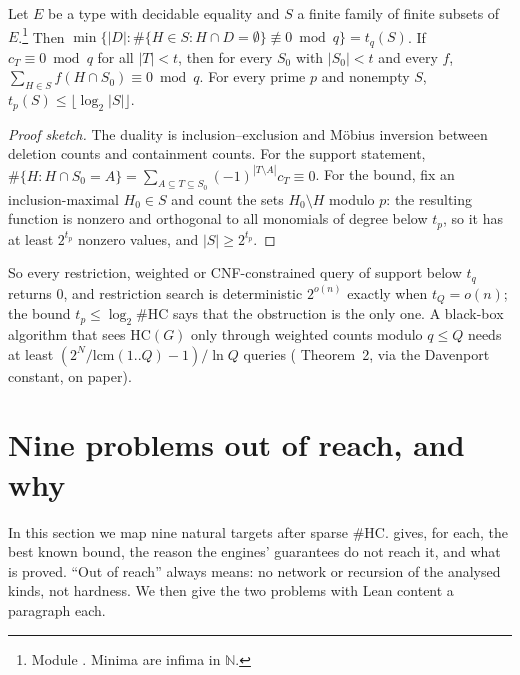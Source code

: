 \documentclass[10pt]{amsart}
\theoremstyle{plain}
\theoremstyle{definition}
\theoremstyle{remark}
\numberwithin{equation}{section}
\newcommand{\N}{\mathbb{N}}
\begin{document}
\begin{theorem}\label{thm:derand}
Let $E$ be a type with decidable equality and $S$ a finite family of finite subsets of
$E$.\footnote{Module . Minima are infima in $\N$.} Then $\min\{|D|:\#\{H\in S:H\cap
D=\emptyset\}\not\equiv0\bmod q\}=t_q(S)$. If $c_T\equiv0\bmod q$ for all $|T|<t$, then for every $S_0$
with $|S_0|<t$ and every $f$, $\sum_{H\in S}f(H\cap S_0)\equiv0\bmod q$. For every prime $p$ and
nonempty $S$, $t_p(S)\le\lfloor\log_2|S|\rfloor$.
\end{theorem}
\begin{proof}[Proof sketch]
The duality is inclusion--exclusion and M\"obius inversion between deletion counts and containment
counts. For the support statement, $\#\{H:H\cap S_0=A\}=\sum_{A\subseteq T\subseteq S_0}(-1)^{|T\setminus A|}c_T\equiv0$.
For the bound, fix an inclusion-maximal $H_0\in S$ and count the sets $H_0\setminus H$ modulo $p$: the
resulting function is nonzero and orthogonal to all monomials of degree below $t_p$, so it has at least
$2^{t_p}$ nonzero values, and $|S|\ge2^{t_p}$.
\end{proof}

\noindent So every restriction, weighted or CNF-constrained query of support below $t_q$ returns $0$,
and restriction search is deterministic $2^{o(n)}$ exactly when $t_Q=o(n)$; the bound $t_p\le\log_2\#$HC
says that the obstruction is the only one. A black-box algorithm that sees $\mathrm{HC}(G)$ only
through weighted counts modulo $q\le Q$ needs at least $(2^N/\mathrm{lcm}(1..Q)-1)/\ln Q$ queries
( Theorem~2, via the Davenport constant, on paper).

\section{Nine problems out of reach, and why}\label{sec:map}

In this section we map nine natural targets after sparse $\#$HC.  gives, for each, the
best known bound, the reason the engines' guarantees do not reach it, and what is proved. ``Out of
reach'' always means: no network or recursion of the analysed kinds, not hardness. We then give the two
problems with Lean content a paragraph each.
\end{document}
